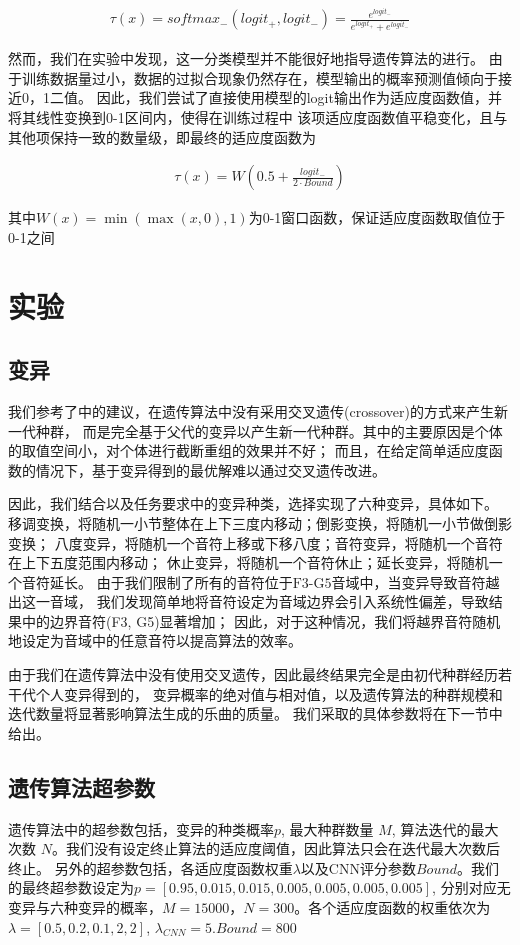 \documentclass{article}
\begin{document}
\begin{align}
    \tau(x) = softmax_{-}(logit_{+}, logit_{-}) = \frac{e^{logit_{-}}}{e^{logit_{+}} + e^{logit_{-}}}
\end{align}

然而，我们在实验中发现，这一分类模型并不能很好地指导遗传算法的进行。
由于训练数据量过小，数据的过拟合现象仍然存在，模型输出的概率预测值倾向于接近0，1二值。
因此，我们尝试了直接使用模型的logit输出作为适应度函数值，并将其线性变换到0-1区间内，使得在训练过程中
该项适应度函数值平稳变化，且与其他项保持一致的数量级，即最终的适应度函数为

\begin{align}
    \tau(x) = W(0.5 + \frac{logit_{-}}{2 \cdot Bound})
\end{align}

其中$W(x) = \min(\max(x, 0), 1)$为0-1窗口函数，保证适应度函数取值位于0-1之间

\section{实验}
\subsection{变异}
我们参考了\cite{article2}中的建议，在遗传算法中没有采用交叉遗传(crossover)的方式来产生新一代种群，
而是完全基于父代的变异以产生新一代种群。其中的主要原因是个体的取值空间小，对个体进行截断重组的效果并不好；
而且，在给定简单适应度函数的情况下，基于变异得到的最优解难以通过交叉遗传改进。

因此，我们结合\cite{article2}以及任务要求中的变异种类，选择实现了六种变异，具体如下。
移调变换，将随机一小节整体在上下三度内移动；倒影变换，将随机一小节做倒影变换；
八度变异，将随机一个音符上移或下移八度；音符变异，将随机一个音符在上下五度范围内移动；
休止变异，将随机一个音符休止；延长变异，将随机一个音符延长。
由于我们限制了所有的音符位于$\text{F3-G5}$音域中，当变异导致音符越出这一音域，
我们发现简单地将音符设定为音域边界会引入系统性偏差，导致结果中的边界音符(F3, G5)显著增加；
因此，对于这种情况，我们将越界音符随机地设定为音域中的任意音符以提高算法的效率。

由于我们在遗传算法中没有使用交叉遗传，因此最终结果完全是由初代种群经历若干代个人变异得到的，
变异概率的绝对值与相对值，以及遗传算法的种群规模和迭代数量将显著影响算法生成的乐曲的质量。
我们采取的具体参数将在下一节中给出。

\subsection{遗传算法超参数}
遗传算法中的超参数包括，变异的种类概率$p$, 最大种群数量 $M$, 算法迭代的最大次数 $N$。我们没有设定终止算法的适应度阈值，因此算法只会在迭代最大次数后终止。
另外的超参数包括，各适应度函数权重$\lambda$以及CNN评分参数$Bound$。我们的最终超参数设定为$p = [0.95, 0.015, 0.015, 0.005, 0.005, 0.005, 0.005]$,
分别对应无变异与六种变异的概率，$M=15000， N=300$。各个适应度函数的权重依次为$\lambda = [0.5, 0.2, 0.1, 2, 2]$, $\lambda_{CNN}=5. Bound = 800$
\end{document}
